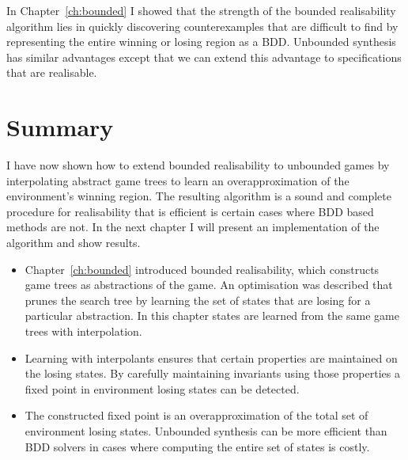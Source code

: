 In Chapter~\ref{ch:bounded} I showed that the strength of the bounded realisability algorithm lies in quickly discovering counterexamples that are difficult to find by representing the entire winning or losing region as a BDD. Unbounded synthesis has similar advantages except that we can extend this advantage to specifications that are realisable.

\section{Summary}

I have now shown how to extend bounded realisability to unbounded games by interpolating abstract game trees to learn an overapproximation of the environment's winning region. The resulting algorithm is a sound and complete procedure for realisability that is efficient is certain cases where BDD based methods are not. In the next chapter I will present an implementation of the algorithm and show results.

\begin{itemize}
    \item Chapter~\ref{ch:bounded} introduced bounded realisability, which constructs game trees as abstractions of the game. An optimisation was described that prunes the search tree by learning the set of states that are losing for a particular abstraction. In this chapter states are learned from the same game trees with interpolation.
    \item Learning with interpolants ensures that certain properties are maintained on the losing states. By carefully maintaining invariants using those properties a fixed point in environment losing states can be detected.
    \item The constructed fixed point is an overapproximation of the total set of environment losing states. Unbounded synthesis can be more efficient than BDD solvers in cases where computing the entire set of states is costly.
\end{itemize}
